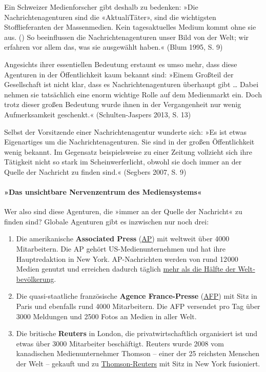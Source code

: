 Ein Schweizer Medienforscher gibt deshalb zu bedenken: »Die
Nachrichtenagenturen sind die «AktualiTäter», sind die wichtigsten
Stofflieferanten der Massenmedien. Kein tages­aktuelles Medium kommt
ohne sie aus. () So beeinflussen die Nachrichtenagenturen unser Bild von
der Welt; wir erfahren vor allem das, was sie ausgewählt haben.« (Blum
1995, S. 9)

Angesichts ihrer essentiellen Bedeutung erstaunt es umso mehr, dass
diese Agenturen in der Öffentlichkeit kaum bekannt sind: »Einem Großteil
der Gesellschaft ist nicht klar, dass es Nachrichtenagenturen überhaupt
gibt \ldots{} Dabei nehmen sie tatsächlich eine enorm wichtige Rolle auf
dem Medienmarkt ein. Doch trotz dieser großen Bedeutung wurde ihnen in
der Vergangenheit nur wenig Aufmerksamkeit geschenkt.« (Schulten-Jaspers
2013, S. 13)

Selbst der Vorsitzende einer Nachrichtenagentur wunderte sich: »Es ist
etwas Eigenartiges um die Nachrichtenagenturen. Sie sind in der großen
Öffentlichkeit wenig bekannt. Im Gegensatz beispielsweise zu einer
Zeitung vollzieht sich ihre Tätigkeit nicht so stark im
Scheinwerfer­licht, obwohl sie doch immer an der Quelle der Nachricht zu
finden sind.« (Segbers 2007, S. 9)

\hypertarget{das-unsichtbare-nervenzentrum-des-mediensystems}{%
\paragraph{»Das unsichtbare Nervenzentrum des
Mediensystems«}\label{das-unsichtbare-nervenzentrum-des-mediensystems}}

Wer also sind diese Agenturen, die »immer an der Quelle der Nachricht«
zu finden sind? Globale Agenturen gibt es inzwischen nur noch drei:

\begin{enumerate}
\def\labelenumi{\arabic{enumi}.}
\tightlist
\item
  Die amerikanische \textbf{Associated Press}
  (\href{https://de.wikipedia.org/wiki/Associated_Press}{AP}) mit
  weltweit über 4000 Mitarbeitern. Die AP gehört US-Medienunternehmen
  und hat ihre Hauptredaktion in New York. AP-Nachrichten werden von
  rund 12 000 Medien genutzt und erreichen dadurch täglich
  \href{http://www.ap.org/company/overview}{mehr als die Hälfte der
  Welt­bevölkerung}.
\item
  Die quasi-staatliche französische \textbf{Agence France-Presse}
  (\href{https://de.wikipedia.org/wiki/Agence_France-Presse}{AFP}) mit
  Sitz in Paris und ebenfalls rund 4000 Mitarbeitern. Die AFP versendet
  pro Tag über 3000 Meldungen und 2500 Fotos an Medien in aller Welt.
\item
  Die britische \textbf{Reuters} in London, die privatwirtschaftlich
  organisiert ist und etwas über 3000 Mitarbeiter beschäftigt. Reuters
  wurde 2008 vom kanadischen Medienunternehmer Thomson -- einer der 25
  reichsten Menschen der Welt -- gekauft und zu
  \href{https://de.wikipedia.org/wiki/Reuters}{Thomson-Reuters} mit Sitz
  in New York fusioniert.
\end{enumerate}

